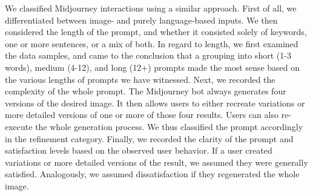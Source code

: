 We classified Midjourney interactions using a similar approach.
First of all, we differentiated between image- and purely language-based inputs.
We then considered the length of the prompt, and whether it consisted solely of keywords, one
or more sentences, or a mix of both.
In regard to length, we first examined the data samples, and came to the conclusion that a
grouping into short (1-3 words), medium (4-12), and long (12+) prompts made the most sense based
on the various lengths of prompts we have witnessed.
Next, we recorded the complexity of the whole prompt.
The Midjourney bot always generates four versions of the desired image.
It then allows users to either recreate variations or more detailed versions of one or more of
those four results.
Users can also re-execute the whole generation process.
We thus classified the prompt accordingly in the refinement category.
Finally, we recorded the clarity of the prompt and satisfaction levels based
on the observed user behavior.
If a user created variations or more detailed versions of the result, we assumed they were
generally satisfied.
Analogously, we assumed dissatisfaction if they regenerated the whole image.

